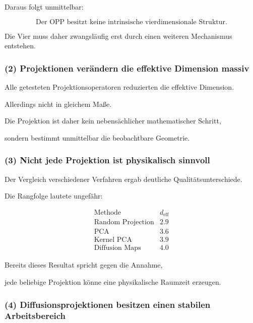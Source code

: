 Daraus folgt unmittelbar:

\[
\boxed{
\text{Der OPP besitzt keine intrinsische vierdimensionale Struktur.}
}
\]

Die Vier muss daher zwangsläufig erst durch einen weiteren Mechanismus entstehen.


\subsubsection*{(2) Projektionen verändern die effektive Dimension massiv}

Alle getesteten Projektionsoperatoren reduzierten die effektive Dimension.

Allerdings nicht in gleichem Maße.

Die Projektion ist daher kein nebensächlicher mathematischer Schritt,

sondern bestimmt unmittelbar die beobachtbare Geometrie.


\subsubsection*{(3) Nicht jede Projektion ist physikalisch sinnvoll}

Der Vergleich verschiedener Verfahren ergab deutliche Qualitätsunterschiede.

Die Rangfolge lautete ungefähr:

\[
\begin{array}{l|c}
\text{Methode}
&
d_{\mathrm{eff}}
\\
\hline
\text{Random Projection}
&
2.9
\\
\text{PCA}
&
3.6
\\
\text{Kernel PCA}
&
3.9
\\
\text{Diffusion Maps}
&
4.0
\end{array}
\]

Bereits dieses Resultat spricht gegen die Annahme,

jede beliebige Projektion könne eine physikalische Raumzeit erzeugen.


\subsubsection*{(4) Diffusionsprojektionen besitzen einen stabilen Arbeitsbereich}

